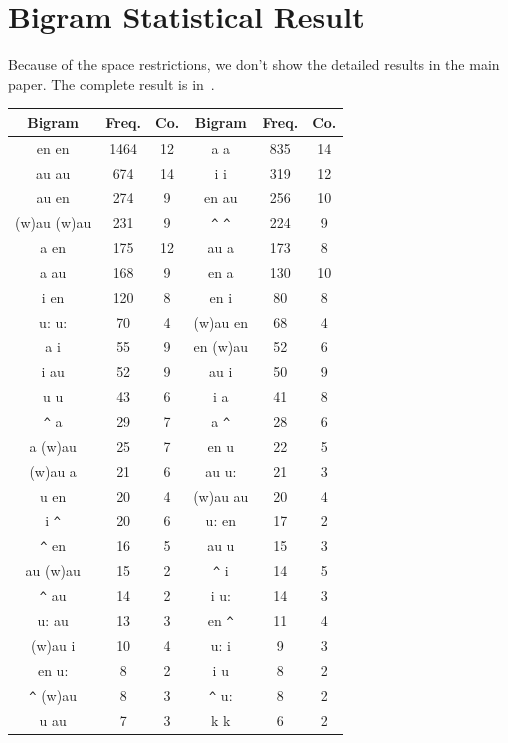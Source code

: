 \section{Bigram Statistical Result}
\label{sec:appendixc}

Because of the space restrictions, we don't show the detailed results in the main paper. The complete result is in~.

\begin{table}[th]
\centering
\small
\begin{tabular}{c|c|c|c|c|c}
\hline
\textbf{Bigram} & \textbf{Freq.} & \textbf{Co.} & \textbf{Bigram} & \textbf{Freq.} & \textbf{Co.}\\
\hline
en en & 1464 & 12 & a a & 835 & 14 \\
au au & 674 & 14 & i i & 319 & 12 \\
au en & 274 & 9 & en au & 256 & 10 \\
(w)au (w)au & 231 & 9 & \verb|^| \verb|^| & 224 & 9 \\
a en & 175 & 12 & au a & 173 & 8 \\
a au & 168 & 9 & en a & 130 & 10 \\
i en & 120 & 8 & en i & 80 & 8 \\
u: u: & 70 & 4 & (w)au en & 68 & 4 \\
a i & 55 & 9 & en (w)au & 52 & 6 \\
i au & 52 & 9 & au i & 50 & 9 \\
u u & 43 & 6 & i a & 41 & 8 \\
\verb|^| a & 29 & 7 & a \verb|^| & 28 & 6 \\
a (w)au & 25 & 7 & en u & 22 & 5 \\
(w)au a & 21 & 6 & au u: & 21 & 3 \\
u en & 20 & 4 & (w)au au & 20 & 4 \\
i \verb|^| & 20 & 6 & u: en & 17 & 2 \\
\verb|^| en & 16 & 5 & au u & 15 & 3 \\
au (w)au & 15 & 2 & \verb|^| i & 14 & 5 \\
\verb|^| au & 14 & 2 & i u: & 14 & 3 \\
u: au & 13 & 3 & en \verb|^| & 11 & 4 \\
(w)au i & 10 & 4 & u: i & 9 & 3 \\
en u: & 8 & 2 & i u & 8 & 2 \\
\verb|^| (w)au & 8 & 3 & \verb|^| u: & 8 & 2 \\
u au & 7 & 3 & k k & 6 & 2 \\

\end{tabular}
\end{table}
